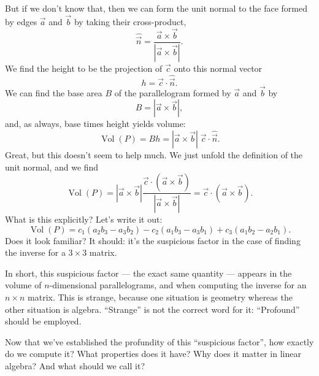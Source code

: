 But if we don't know that, then we can form the unit normal to the face
formed by edges $\vec{a}$ and $\vec{b}$ by taking their cross-product,
\begin{equation}
\widehat{\vec{n}} = \frac{\vec{a}\times\vec{b}}{|\vec{a}\times\vec{b}|}.
\end{equation}
We find the height to be the projection of $\vec{c}$ onto this normal
vector
\begin{equation}
h = \vec{c}\cdot\widehat{\vec{n}}.
\end{equation}
We can find the base area $B$ of the parallelogram formed by $\vec{a}$
and $\vec{b}$ by
\begin{equation}
B = |\vec{a}\times\vec{b}|,
\end{equation}
and, as always, base times height yields volume:
\begin{equation}
\operatorname{Vol}(P) = Bh = |\vec{a}\times\vec{b}|\;\vec{c}\cdot\widehat{\vec{n}}.
\end{equation}
Great, but this doesn't seem to help much. We just unfold the definition
of the unit normal, and we find
\begin{equation}
\operatorname{Vol}(P) = |\vec{a}\times\vec{b}|\frac{\vec{c}\cdot(\vec{a}\times\vec{b})}{|\vec{a}\times\vec{b}|}
= \vec{c}\cdot(\vec{a}\times\vec{b}).
\end{equation}
What is this explicitly? Let's write it out:
\begin{equation}
\operatorname{Vol}(P) = c_{1}(a_{2}b_{3}-a_{3}b_{2}) - c_{2}(a_{1}b_{3}-a_{3}b_{1})
+ c_{3}(a_{1}b_{2}-a_{2}b_{1}).
\end{equation}
Does it look familiar? It should: it's the suspicious factor in the case
of finding the inverse for a $3\times 3$ matrix.

\M
In short, this suspicious factor --- the exact same quantity --- appears
in the volume of $n$-dimensional parallelograms, and when computing the
inverse for an $n\times n$ matrix. This is strange, because one
situation is geometry whereas the other situation is
algebra. ``Strange'' is not the correct word for it: ``Profound'' should
be employed.

Now that we've established the profundity of this ``suspicious factor'',
how exactly do we compute it? What properties does it have? Why does it
matter in linear algebra? And what should we call it?

